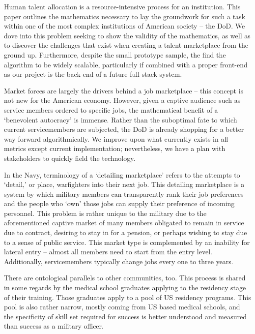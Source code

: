 Human talent allocation is a resource-intensive process for an institution. This paper outlines the mathematics necessary to lay the groundwork for such a task within one of the most complex institutions of American society -- the DoD.  We dove into this problem seeking to show the validity of the mathematics, as well as to discover the challenges that exist when creating a talent marketplace from the ground up. Furthermore, despite the small prototype sample, the find the algorithm to be widely scalable, particularly if combined with a proper front-end as our project is the back-end of a future full-stack system. 

Market forces are largely the drivers behind a job marketplace -- this concept is not new for the American economy.  However, given a captive audience such as service members ordered to specific jobs, the mathematical benefit of a ‘benevolent autocracy’ is immense.  Rather than the suboptimal fate to which current servicemembers are subjected, the DoD is already shopping for a better way forward algorithmically.  We improve upon what currently exists in all metrics except current implementation; nevertheless, we have a plan with stakeholders to quickly field the technology. 

In the Navy, terminology of a ‘detailing marketplace’ refers to the attempts to ‘detail,’ or place, warfighters into their next job.  This detailing marketplace is a system by which military members can transparently rank their job preferences and the people who ‘own’ those jobs can supply their preference of incoming personnel. This problem is rather unique to the military due to the aforementioned captive market of many members obligated to remain in service due to contract, desiring to stay in for a pension, or perhaps wishing to stay due to a sense of public service. This market type is complemented by an inability for lateral entry -- almost all members need to start from the entry level.  Additionally, servicemembers typically change jobs every one to three years. 

There are ontological parallels to other communities, too. This process is shared in some regards by the medical school graduates applying to the residency stage of their training. Those graduates apply to a pool of US residency programs. This pool is also rather narrow, mostly coming from US based medical schools, and the specificity of skill set required for success is better understood and measured than success as a military officer. 


